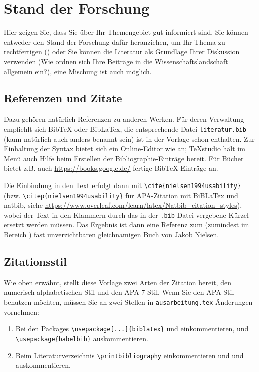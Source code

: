 
\chapter{Stand der Forschung}
Hier zeigen Sie, dass Sie über Ihr Themengebiet gut informiert sind. Sie können entweder den Stand der Forschung dafür heranziehen, um Ihr Thema zu rechtfertigen () oder Sie können die Literatur als Grundlage Ihrer Diskussion verwenden (Wie ordnen sich Ihre Beiträge in die Wissenschaftslandschaft allgemein ein?), eine Mischung ist auch möglich.

\section{Referenzen und Zitate}

Dazu gehören natürlich Referenzen zu anderen Werken. Für deren Verwaltung empfiehlt sich BibTeX oder BibLaTex, die entsprechende Datei \verb|literatur.bib| (kann natürlich auch anders benannt sein) ist in der Vorlage schon enthalten. Zur Einhaltung der Syntax bietet sich ein Online-Editor wie \cite{BibTexOnlineEditor} an; TeXstudio \cite{texstudio} hält im Menü auch Hilfe beim Erstellen der Bibliographie-Einträge bereit. Für Bücher bietet z.B. auch \url{https://books.google.de/} fertige BibTeX-Einträge an.

Die Einbindung in den Text erfolgt dann mit \verb|\cite{nielsen1994usability}| (bzw. \verb|\citep{nielsen1994usability}| für APA-Zitation mit BiBLaTex und natbib, siehe \url{https://www.overleaf.com/learn/latex/Natbib_citation_styles}), wobei der Text in den Klammern durch das in der \verb|.bib|-Datei vergebene Kürzel ersetzt werden müssen. Das Ergebnis ist dann eine Referenz zum (zumindest im Bereich ) fast unverzichtbaren gleichnamigen Buch \cite{nielsen1994usability} von Jakob Nielsen.

\section{Zitationsstil}

Wie oben erwähnt, stellt diese Vorlage zwei Arten der Zitation bereit,
den numerisch-alphabeti\-schen Stil und den APA-7-Stil. Wenn Sie den
APA-Stil benutzen möchten, müssen Sie an zwei Stellen in
\verb|ausarbeitung.tex| Änderungen vornehmen:

\begin{enumerate}
\item Bei den Packages \lstinline[style=latexinline]|\usepackage[...]{biblatex}| und
  \lstinline[style=latexinline]|| einkommentieren, und
  \lstinline[style=latexinline]|\usepackage{babelbib}| auskommentieren.
\item Beim Literaturverzeichnis \lstinline[style=latexinline]|\printbibliography|
  einkommentieren und  \lstinline[style=latexinline]|| und
  \lstinline[style=latexinline]|| auskommentieren.
\end{enumerate}

